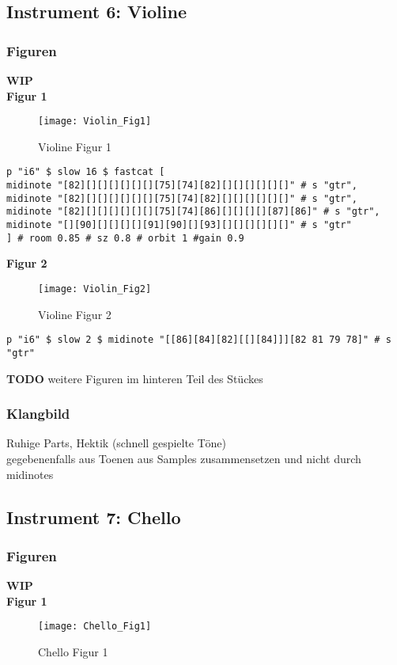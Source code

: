 \documentclass[
10pt, %
a4paper, %
oneside, %
headinclude,footinclude, %
BCOR5mm, %
]{scrartcl}
\begin{document}
\subsection{Instrument 6: Violine}
\subsubsection{Figuren}
{\color{orange}\textbf{WIP}} \\
\noindent\textbf{Figur 1}\\
\begin{figure}[h]
	\centering 
	\texttt{[image: Violin\_Fig1]} 
	\caption{Violine Figur 1}
\end{figure}

\begin{lstlisting}
p "i6" $ slow 16 $ fastcat [
midinote "[82][][][][][][][75][74][82][][][][][][]" # s "gtr",
midinote "[82][][][][][][][75][74][82][][][][][][]" # s "gtr",
midinote "[82][][][][][][][75][74][86][][][][][87][86]" # s "gtr",
midinote "[][90][][][][][91][90][][93][][][][][][]" # s "gtr"
] # room 0.85 # sz 0.8 # orbit 1 #gain 0.9
\end{lstlisting}

\noindent\textbf{Figur 2}\\
\begin{figure}[h]
	\centering 
	\texttt{[image: Violin\_Fig2]} 
	\caption{Violine Figur 2}
\end{figure}

\begin{lstlisting}
p "i6" $ slow 2 $ midinote "[[86][84][82][[][84]]][82 81 79 78]" # s "gtr"
\end{lstlisting}

{\color{red}\textbf{TODO}} weitere Figuren im hinteren Teil des Stückes

\subsubsection{Klangbild}
Ruhige Parts, Hektik (schnell gespielte Töne)\\
gegebenenfalls aus Toenen aus Samples zusammensetzen und nicht durch midinotes


\subsection{Instrument 7: Chello}
\subsubsection{Figuren}
{\color{orange}\textbf{WIP}} \\
\noindent\textbf{Figur 1}\\
\begin{figure}[h]
	\centering 
	\texttt{[image: Chello\_Fig1]} 
	\caption{Chello Figur 1}
\end{figure}
\end{document}
